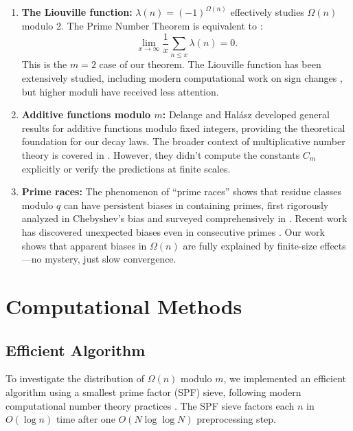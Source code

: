 \documentclass[12pt]{article}
\theoremstyle{definition}
\theoremstyle{remark}
\begin{document}
\begin{enumerate}
\item \textbf{The Liouville function:} $\lambda(n) = (-1)^{\Omega(n)}$ effectively studies $\Omega(n)$ modulo 2. The Prime Number Theorem is equivalent to \cite{polya1919verschiedene}:
\[
\lim_{x \to \infty} \frac{1}{x} \sum_{n \leq x} \lambda(n) = 0.
\]
This is the $m = 2$ case of our theorem. The Liouville function has been extensively studied, including modern computational work on sign changes \cite{borwein2008sign}, but higher moduli have received less attention.

\item \textbf{Additive functions modulo $m$:} Delange \cite{delange1975distribution} and Hal\'asz \cite{halasz1977distribution} developed general results for additive functions modulo fixed integers, providing the theoretical foundation for our decay laws. The broader context of multiplicative number theory is covered in \cite{davenport2000multiplicative}. However, they didn't compute the constants $C_m$ explicitly or verify the predictions at finite scales.

\item \textbf{Prime races:} The phenomenon of ``prime races'' shows that residue classes modulo $q$ can have persistent biases in containing primes, first rigorously analyzed in Chebyshev's bias \cite{rubinstein1994chebyshev} and surveyed comprehensively in \cite{granville2004prime}. Recent work has discovered unexpected biases even in consecutive primes \cite{lemke2016unexpected}. Our work shows that apparent biases in $\Omega(n)$ are fully explained by finite-size effects—no mystery, just slow convergence.
\end{enumerate}

\section{Computational Methods}

\subsection{Efficient Algorithm}

To investigate the distribution of $\Omega(n)$ modulo $m$, we implemented an efficient algorithm using a smallest prime factor (SPF) sieve, following modern computational number theory practices \cite{bach1996algorithmic}. The SPF sieve factors each $n$ in $O(\log n)$ time after one $O(N \log \log N)$ preprocessing step.
\end{document}
